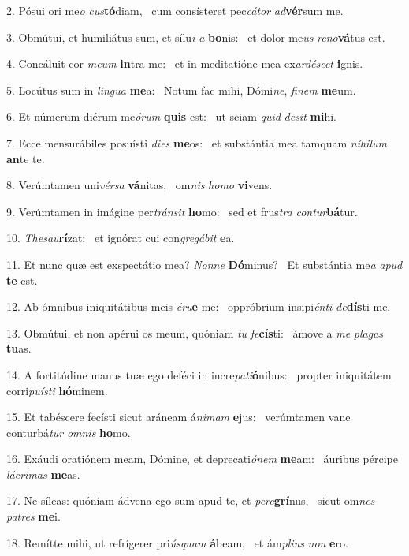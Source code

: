 2. Pósui ori me\textit{o} \textit{cus}\textbf{tó}diam, \ast\  cum consísteret pec\textit{cá}\textit{tor} \textit{ad}\textbf{vér}sum me.\

3. Obmútui, et humiliátus sum, et sílu\textit{i} \textit{a} \textbf{bo}nis: \ast\  et dolor me\textit{us} \textit{re}\textit{no}\textbf{vá}tus est.\

4. Concáluit cor \textit{me}\textit{um} \textbf{in}tra me: \ast\  et in meditatióne mea ex\textit{ar}\textit{dé}\textit{scet} \textbf{i}gnis.\

5. Locútus sum in \textit{lin}\textit{gua} \textbf{me}a: \ast\  Notum fac mihi, Dómi\textit{ne}, \textit{fi}\textit{nem} \textbf{me}um.\

6. Et númerum diérum me\textit{ó}\textit{rum} \textbf{quis} est: \ast\  ut sciam \textit{quid} \textit{de}\textit{sit} \textbf{mi}hi.\

7. Ecce mensurábiles posuísti \textit{di}\textit{es} \textbf{me}os: \ast\  et substántia mea tamquam \textit{ní}\textit{hi}\textit{lum} \textbf{an}te te.\

8. Verúmtamen uni\textit{vér}\textit{sa} \textbf{vá}nitas, \ast\  om\textit{nis} \textit{ho}\textit{mo} \textbf{vi}vens.\

9. Verúmtamen in imágine per\textit{tráns}\textit{it} \textbf{ho}mo: \ast\  sed et frus\textit{tra} \textit{con}\textit{tur}\textbf{bá}tur.\

10. \textit{The}\textit{sau}\textbf{rí}zat: \ast\  et ignórat cui con\textit{gre}\textit{gá}\textit{bit} \textbf{e}a.\

11. Et nunc quæ est exspectátio mea? \textit{Non}\textit{ne} \textbf{Dó}minus? \ast\  Et substántia me\textit{a} \textit{a}\textit{pud} \textbf{te} est.\

12. Ab ómnibus iniquitátibus meis \textit{é}\textit{ru}\textbf{e} me: \ast\  oppróbrium insipi\textit{én}\textit{ti} \textit{de}\textbf{dís}ti me.\

13. Obmútui, et non apérui os meum, quóniam \textit{tu} \textit{fe}\textbf{cís}ti: \ast\  ámove a \textit{me} \textit{pla}\textit{gas} \textbf{tu}as.\

14. A fortitúdine manus tuæ ego deféci in incre\textit{pa}\textit{ti}\textbf{ó}nibus: \ast\  propter iniquitátem corri\textit{pu}\textit{ís}\textit{ti} \textbf{hó}minem.\

15. Et tabéscere fecísti sicut aráneam á\textit{ni}\textit{mam} \textbf{e}jus: \ast\  verúmtamen vane conturbá\textit{tur} \textit{om}\textit{nis} \textbf{ho}mo.\

16. Exáudi oratiónem meam, Dómine, et deprecati\textit{ó}\textit{nem} \textbf{me}am: \ast\  áuribus pércipe \textit{lá}\textit{cri}\textit{mas} \textbf{me}as.\

17. Ne síleas: quóniam ádvena ego sum apud te, et \textit{per}\textit{e}\textbf{grí}nus, \ast\  sicut om\textit{nes} \textit{pa}\textit{tres} \textbf{me}i.\

18. Remítte mihi, ut refrígerer pri\textit{ús}\textit{quam} \textbf{á}beam, \ast\  et ám\textit{pli}\textit{us} \textit{non} \textbf{e}ro.\

